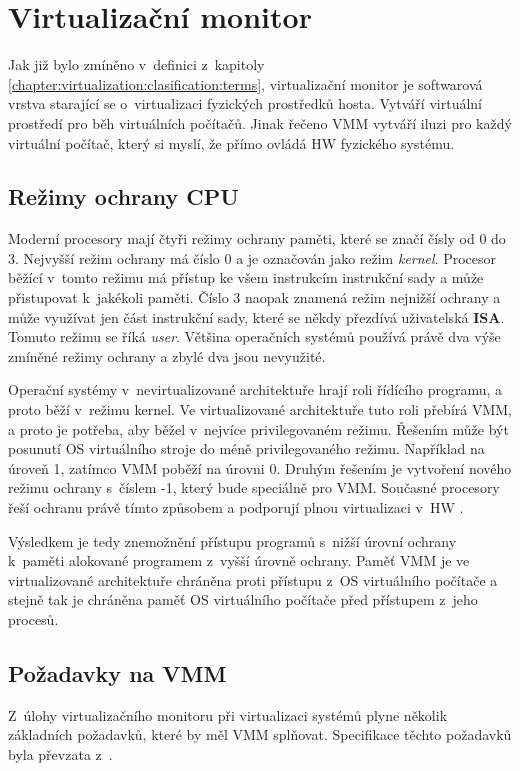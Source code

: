 \section{Virtualizační monitor}
\label{chapter:virtualization:vmm}
Jak již bylo zmíněno v~definici z~kapitoly \ref{chapter:virtualization:clasification:terms}, virtualizační monitor je softwarová
vrstva starající se o~virtualizaci fyzických prostředků hosta. Vytváří virtuální prostředí pro běh virtuálních počítačů.
Jinak řečeno VMM vytváří iluzi pro každý virtuální počítač, který si myslí, že přímo ovládá HW fyzického systému.
\subsection{Režimy ochrany CPU}
\label{chapter:virtualization:rings}
Moderní procesory mají čtyři režimy ochrany paměti, které se značí čísly od 0 do 3. Nejvyšší režim ochrany má číslo 0 a je
označován jako režim \textit{kernel}. Procesor běžící v~tomto režimu má přístup ke všem instrukcím instrukční sady a může 
přistupovat k~jakékoli paměti. Číslo 3 naopak znamená režim nejnižší ochrany a může využívat jen část instrukční sady, které
se někdy přezdívá uživatelská \textbf{ISA}. Tomuto režimu se říká \textit{user}. Většina operačních systémů používá právě 
dva výše zmíněné režimy ochrany a zbylé dva jsou nevyužité.

Operační systémy v~nevirtualizované architektuře hrají roli řídícího programu, a proto běží v~režimu kernel. Ve virtualizované
architektuře tuto roli přebírá VMM, a proto je potřeba, aby běžel v~nejvíce privilegovaném režimu. Řešením může být posunutí
OS virtuálního stroje do méně privilegovaného režimu. Například na úroveň 1, zatímco VMM poběží na úrovni 0. Druhým řešením
je vytvoření nového režimu ochrany s~číslem -1, který bude speciálně pro VMM. Současné procesory řeší ochranu právě tímto
způsobem a podporují plnou virtualizaci v~HW \cite{cvut:presentation:virt2}.

Výsledkem je tedy znemožnění přístupu programů s~nižší úrovní ochrany k~paměti alokované programem z~vyšší úrovně ochrany.
Paměť VMM je ve virtualizované architektuře chráněna proti přístupu z~OS virtuálního počítače a stejně tak je chráněna paměť
OS virtuálního počítače před přístupem z~jeho procesů.
\subsection{Požadavky na VMM}
\label{chapter:virtualization:vmm:demands}
Z~úlohy virtualizačního monitoru při virtualizaci systémů plyne několik základních požadavků, které by měl VMM splňovat.
Specifikace těchto požadavků byla převzata z~\cite{cvut:presentation:virt2}.
